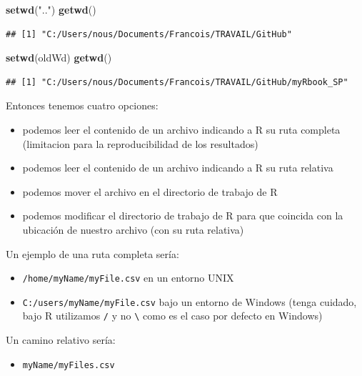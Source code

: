 \documentclass[
]{book}
\newenvironment{Shaded}{\begin{snugshade}}{\end{snugshade}}
\newcommand{\KeywordTok}[1]{\textcolor[rgb]{0.13,0.29,0.53}{\textbf{#1}}}
\newcommand{\NormalTok}[1]{#1}
\newcommand{\StringTok}[1]{\textcolor[rgb]{0.31,0.60,0.02}{#1}}
\providecommand{\tightlist}{%
  \setlength{\itemsep}{0pt}\setlength{\parskip}{0pt}}
\begin{document}
\begin{Shaded}
\begin{Highlighting}[]
\KeywordTok{setwd}\NormalTok{(}\StringTok{".."}\NormalTok{)}
\KeywordTok{getwd}\NormalTok{()}
\end{Highlighting}
\end{Shaded}

\begin{verbatim}
## [1] "C:/Users/nous/Documents/Francois/TRAVAIL/GitHub"
\end{verbatim}

\begin{Shaded}
\begin{Highlighting}[]
\KeywordTok{setwd}\NormalTok{(oldWd)}
\KeywordTok{getwd}\NormalTok{()}
\end{Highlighting}
\end{Shaded}

\begin{verbatim}
## [1] "C:/Users/nous/Documents/Francois/TRAVAIL/GitHub/myRbook_SP"
\end{verbatim}

Entonces tenemos cuatro opciones:

\begin{itemize}
\tightlist
\item
  podemos leer el contenido de un archivo indicando a R su ruta completa (limitacion para la reproducibilidad de los resultados)
\item
  podemos leer el contenido de un archivo indicando a R su ruta relativa
\item
  podemos mover el archivo en el directorio de trabajo de R
\item
  podemos modificar el directorio de trabajo de R para que coincida con la ubicación de nuestro archivo (con su ruta relativa)
\end{itemize}

Un ejemplo de una ruta completa sería:

\begin{itemize}
\tightlist
\item
  \texttt{/home/myName/myFile.csv} en un entorno UNIX
\item
  \texttt{C:/users/myName/myFile.csv} bajo un entorno de Windows (tenga cuidado, bajo R utilizamos \texttt{/} y no \texttt{\textbackslash{}} como es el caso por defecto en Windows)
\end{itemize}

Un camino relativo sería:

\begin{itemize}
\tightlist
\item
  \texttt{myName/myFiles.csv}
\end{itemize}
\end{document}
